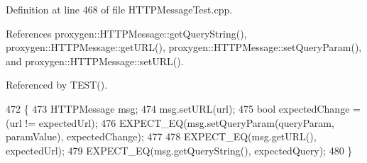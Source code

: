 Definition at line 468 of file H\+T\+T\+P\+Message\+Test.\+cpp.



References proxygen\+::\+H\+T\+T\+P\+Message\+::get\+Query\+String(), proxygen\+::\+H\+T\+T\+P\+Message\+::get\+U\+R\+L(), proxygen\+::\+H\+T\+T\+P\+Message\+::set\+Query\+Param(), and proxygen\+::\+H\+T\+T\+P\+Message\+::set\+U\+R\+L().



Referenced by T\+E\+S\+T().


\begin{DoxyCode}
472                                                     \{
473   HTTPMessage msg;
474   msg.setURL(url);
475   \textcolor{keywordtype}{bool} expectedChange = (url != expectedUrl);
476   EXPECT\_EQ(msg.setQueryParam(queryParam, paramValue), expectedChange);
477 
478   EXPECT\_EQ(msg.getURL(), expectedUrl);
479   EXPECT\_EQ(msg.getQueryString(), expectedQuery);
480 \}
\end{DoxyCode}
